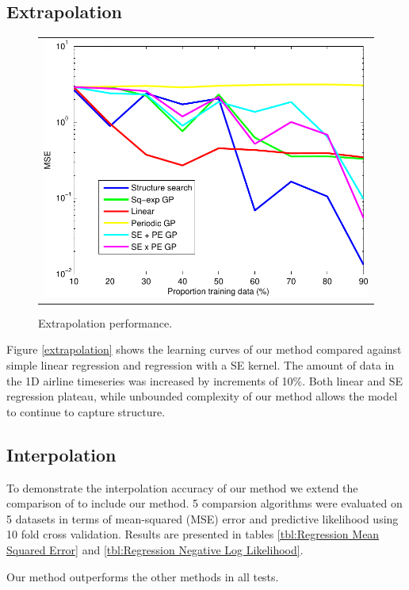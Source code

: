 \documentclass[twoside]{article}
\begin{document}
\subsection{Extrapolation}

\begin{figure}[h!]
\centering
\begin{tabular}{c}
\includegraphics[width=\columnwidth]{../figures/extrapolation_curves/01-airline-s-ex-curve.pdf}
\end{tabular}
\caption{Extrapolation performance.}
\end{figure}

Figure \ref{extrapolation} shows the learning curves of our method compared against simple linear regression and \gp{} regression with a SE kernel.  The amount of data in the 1D airline timeseries was increased by increments of 10\%. Both linear and SE regression plateau, while unbounded complexity of our method allows the model to continue to capture structure. 

\subsection{Interpolation}

To demonstrate the interpolation accuracy of our method we extend the comparison of \cite{duvenaud2011additive11} to include our method.
5 comparsion algorithms were evaluated on 5 datasets in terms of mean-squared (MSE) error and predictive likelihood using 10 fold cross validation.
Results are presented in tables \ref{tbl:Regression Mean Squared Error} and \ref{tbl:Regression Negative Log Likelihood}.
%


%
Our method outperforms the other methods in all tests.
\end{document}
